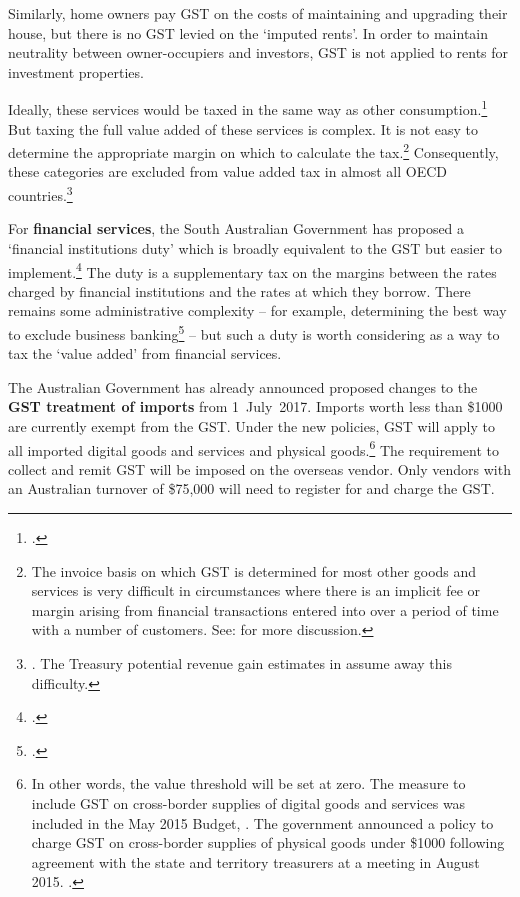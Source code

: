Similarly, home owners pay GST on the costs of maintaining and upgrading their house, but there is no GST levied on the ‘imputed rents’. In order to maintain neutrality between owner-occupiers and investors, GST is not applied to rents for investment properties.

Ideally, these services would be taxed in the same way as other consumption.\footcites{Freebairn2013}[][52]{HenryTaxReview2010}  But taxing the full value added of these services is complex. It is not easy to determine the appropriate margin on which to calculate the tax.\footnote{The invoice basis on which GST is determined for most other goods and services is very difficult in circumstances where there is an implicit fee or margin arising from financial transactions entered into over a period of time with a number of customers. See: \textcites{Evans2015}{Davis2015} for more discussion.}  
Consequently, these categories are excluded from value added tax in almost all OECD countries.\footnote{\textcite[][21]{OECD2014}. The Treasury potential revenue gain estimates in  assume away this difficulty.}  

For \textbf{financial services}, the South Australian Government has proposed a ‘financial institutions duty’ which is broadly equivalent to the GST but easier to implement.\footcites{Evans2015}{Weatherill2015}  The duty is a supplementary tax on the margins between the rates charged by financial institutions and the rates at which they borrow. There remains some administrative complexity – for example, determining the best way to exclude business banking\footcite{Davis2015}  – but such a duty is worth considering as a way to tax the ‘value added’ from financial services. 

The Australian Government has already announced proposed changes to the \textbf{GST treatment of imports} from 1~July~2017. Imports worth less than \$1000 are currently exempt from the GST. Under the new policies, GST will apply to all imported digital goods and services and physical goods.\footnote{In other words, the value threshold will be set at zero. The measure to include GST on cross-border supplies of digital goods and services was included in the May 2015 Budget,
\textcite[][20]{Treasury2015BudgetPapers201516}. The government announced a policy to charge GST on cross-border supplies of physical goods under \$1000 following agreement with the state and territory treasurers at a meeting in August 2015. \textcite{Hockey2015--GST-import-threshold}.}  The requirement to collect and remit GST will be imposed on the overseas vendor. Only vendors with an Australian turnover of \$75,000 will need to register for and charge the GST.

